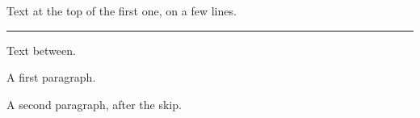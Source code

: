 \documentclass{article}
\begin{document}
\noindent
\begin{minipage}[t]{0.3\linewidth}
  \vspace{0pt}
  \centering
  Text at the top of the first one, on a few lines.
\end{minipage}\hfill
\begin{minipage}[t]{0.3\linewidth}
  \vspace{0pt}
  \centering
  \rule{2cm}{1cm}
\end{minipage}\hfill
\begin{minipage}[t]{0.3\linewidth}
  \vspace{0pt}
  \centering
\end{minipage}

Text between.

\noindent\begin{minipage}{5cm}
A first paragraph.

\vspace{1.5em plus 2pt}

A second paragraph, after the skip.
\end{minipage}
\end{document}
